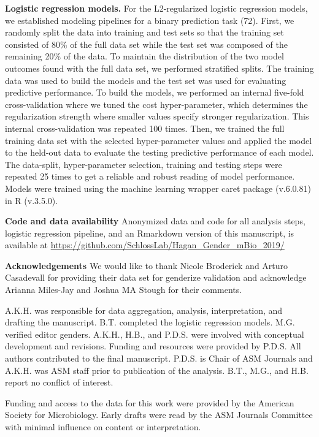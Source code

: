 \documentclass[11pt,]{article}
\begin{document}
\textbf{Logistic regression models.} For the L2-regularized logistic
regression models, we established modeling pipelines for a binary
prediction task (72). First, we randomly split the data into training
and test sets so that the training set consisted of 80\% of the full
data set while the test set was composed of the remaining 20\% of the
data. To maintain the distribution of the two model outcomes found with
the full data set, we performed stratified splits. The training data was
used to build the models and the test set was used for evaluating
predictive performance. To build the models, we performed an internal
five-fold cross-validation where we tuned the cost hyper-parameter,
which determines the regularization strength where smaller values
specify stronger regularization. This internal cross-validation was
repeated 100 times. Then, we trained the full training data set with the
selected hyper-parameter values and applied the model to the held-out
data to evaluate the testing predictive performance of each model. The
data-split, hyper-parameter selection, training and testing steps were
repeated 25 times to get a reliable and robust reading of model
performance. Models were trained using the machine learning wrapper
caret package (v.6.0.81) in R (v.3.5.0).

\textbf{Code and data availability} Anonymized data and code for all
analysis steps, logistic regression pipeline, and an Rmarkdown version
of this manuscript, is available at
\url{https://github.com/SchlossLab/Hagan_Gender_mBio_2019/}

\textbf{Acknowledgements} We would like to thank Nicole Broderick and
Arturo Casadevall for providing their data set for genderize validation
and acknowledge Arianna Miles-Jay and Joshua MA Stough for their
comments.

A.K.H. was responsible for data aggregation, analysis, interpretation,
and drafting the manuscript. B.T. completed the logistic regression
models. M.G. verified editor genders. A.K.H., H.B., and P.D.S. were
involved with conceptual development and revisions. Funding and
resources were provided by P.D.S. All authors contributed to the final
manuscript. P.D.S. is Chair of ASM Journals and A.K.H. was ASM staff
prior to publication of the analysis. B.T., M.G., and H.B. report no
conflict of interest.

Funding and access to the data for this work were provided by the
American Society for Microbiology. Early drafts were read by the ASM
Journals Committee with minimal influence on content or interpretation.
\end{document}
